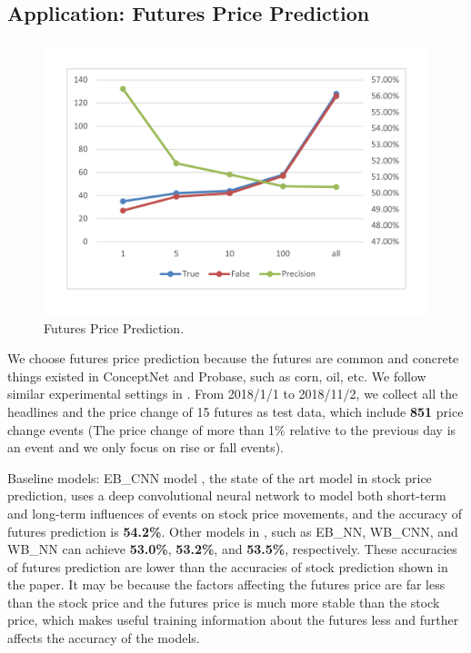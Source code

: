 \subsection{Application: Futures Price Prediction}
\begin{figure}[htbp]
	\begin{center}
		\includegraphics[width=0.9\columnwidth]{figures/rule_futures_prediction}
	\end{center}
	\caption{Futures Price Prediction.}
	\label{fig:futures_price_prediction}
\end{figure}
We choose futures price prediction because the futures are common and concrete things existed in ConceptNet and Probase, such as corn, oil, etc.
We follow similar experimental settings in \cite{Ding}.
From 2018/1/1 to 2018/11/2, we collect all the headlines and the price change of 15 futures as test data, which include \textbf{851} price change events (The price change of more than 1\% relative to the previous day is an event and we only focus on rise or fall events). 

Baseline models: EB\_CNN model \cite{Ding}, the state of the art model in stock price prediction, uses a deep convolutional neural network to model both short-term and long-term influences of events on stock price movements, and the accuracy of futures prediction is \textbf{54.2\%}. Other models in \cite{Ding}, such as EB\_NN, WB\_CNN, and WB\_NN can achieve \textbf{53.0\%}, \textbf{53.2\%}, and \textbf{53.5\%}, respectively. These accuracies of futures prediction are lower than the accuracies of stock prediction shown in the paper.
It may be because the factors affecting the futures price are far less than the stock price and the futures price is much more stable than the stock price, which makes useful training information about the futures less and further affects the accuracy of the models.

